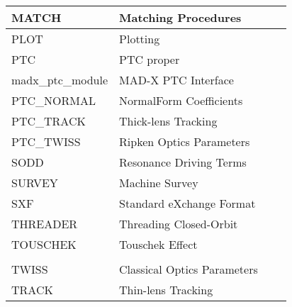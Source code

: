\documentclass{JAC2003}
\begin{document}
\begin{table}[H]
\begin{center}
\begin{tabular}{l|l|l|l}
MATCH              &Matching Procedures         &{\color{green}{O.~Br\"uning}}                   & {\color{red}{Oliver.Bruning@cern.ch}}      \\\hline
PLOT               &Plotting                    &{\color{green}{R.~de~Maria}}                    & {\color{red}{Riccardo.de.Maria@cern.ch}}   \\\hline
PTC                &PTC proper                  &{\color{red}{E.~Forest}} {\color{blue}{KEK}}    & {\color{red}{eforest\_4816968@hotmail.com}}\\\hline
madx_ptc_module    &MAD-X PTC Interface         &{\color{gree}{F.~Schmidt}}                      & {\color{red}{Frank.Schmidt@cern.ch}}       \\\hline
PTC\_NORMAL        &NormalForm Coefficients     &{\color{green}{tba}}                            & {\color{red}{}}                  	      \\\hline
PTC\_TRACK         &Thick-lens Tracking         &{\color{red}{V.~Kapin}}{\color{blue}{ITEP (RU)}}& {\color{red}{Valery.Kapin@cern.ch}}        \\\hline
PTC\_TWISS         &Ripken Optics Parameters    &{\color{green}{tba}}                            & {\color{red}{}}                            \\\hline
SODD               &Resonance Driving Terms     &{\color{green}{F.~Schmidt}}                     & {\color{red}{Frank.Schmidt@cern.ch}}       \\\hline
SURVEY             &Machine Survey              &{\color{green}{F.~Tecker}}                      & {\color{red}{Frank.Tecker@cern.ch}}        \\\hline
SXF                &Standard eXchange Format    &{\color{red}{N.~Malitsky}} {\color{blue}{BNL}}  & {\color{red}{malitsky@bnl.gov}}            \\\hline
THREADER           &Threading Closed-Orbit      &{\color{green}{T.~Risselada}}                   & {\color{red}{Thys.Risselada@cern.ch}}      \\\hline
TOUSCHEK           &Touschek Effect             &{\color{red}{C.~Milardi}\color{blue}{IFNL/LNF}} & {\color{red}{catia.milardi@lnf.infn.it}}   \\
                   &                            &{\color{green}{F.~Zimmermann}}                  & {\color{red}{Frank.Zimmermann@cern.ch} }   \\\hline
TWISS              &Classical Optics Parameters &{\color{green}{F.~Schmidt}}                     & {\color{red}{Frank.Schmidt@cern.ch}}       \\\hline
TRACK              &Thin-lens Tracking          &{\color{green}{A.~Koschik}}                     & {\color{red}{Alexander.Koschik@cern.ch}}   \\\hline
\end{tabular}
\label{Module_Keepers}
\end{center}
\end{table}
%
\end{document}
